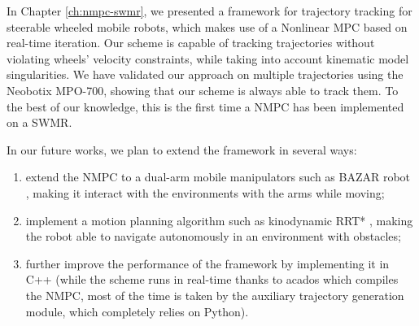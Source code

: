 \medskip

In Chapter \ref{ch:nmpc-swmr}, we presented a framework for trajectory tracking
for steerable wheeled mobile robots, which makes use of a Nonlinear MPC based
on real-time iteration. Our scheme is capable of tracking trajectories without
violating wheels' velocity constraints, while taking into account kinematic
model singularities. We have validated our approach on multiple trajectories
using the Neobotix MPO-700, showing that our scheme is always able to track
them. To the best of our knowledge, this is the first time a NMPC has been
implemented on a SWMR.

In our future works, we plan to extend the framework in several ways:
\begin{enumerate}
    \item extend the NMPC to a dual-arm mobile manipulators such as BAZAR robot
        \cite{Cherubini2019ACR}, making it interact with the environments with
        the arms while moving;
    \item implement a motion planning algorithm such as kinodynamic RRT*
        \cite{Webb2013KinodynamicRRTstar}, making the robot able to navigate
        autonomously in an environment with obstacles;
    \item further improve the performance of the framework by implementing it
        in C++ (while the scheme runs in real-time thanks to acados which
        compiles the NMPC, most of the time is taken by the auxiliary
        trajectory generation module, which completely relies on Python).
\end{enumerate}
